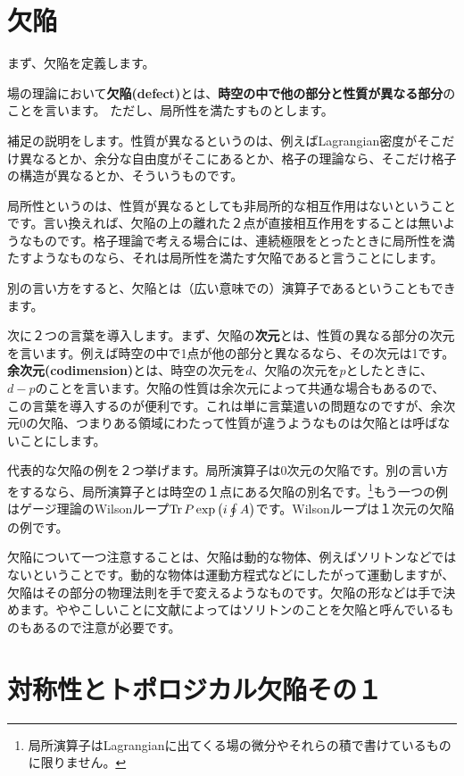 \documentclass[report,paper=a4, fontsize=12pt, line_length=16cm, number_of_lines=33,dvipdfmx]{jlreq}
\newcommand{\kyou}[1]{{\sffamily \bfseries #1}}
\numberwithin{equation}{chapter}
\begin{document}
\section{欠陥}

まず、欠陥を定義します。
\begin{emphasize}
  場の理論において\kyou{欠陥(defect)}とは、\kyou{時空の中で他の部分と性質が異なる部分}のことを言います。 ただし、局所性を満たすものとします。 
\end{emphasize}

補足の説明をします。性質が異なるというのは、例えばLagrangian密度がそこだけ異なるとか、余分な自由度がそこにあるとか、格子の理論なら、そこだけ格子の構造が異なるとか、そういうものです。

局所性というのは、性質が異なるとしても非局所的な相互作用はないということです。言い換えれば、欠陥の上の離れた２点が直接相互作用をすることは無いようなものです。格子理論で考える場合には、連続極限をとったときに局所性を満たすようなものなら、それは局所性を満たす欠陥であると言うことにします。

別の言い方をすると、欠陥とは（広い意味での）演算子であるということもできます。

次に２つの言葉を導入します。まず、欠陥の\kyou{次元}とは、性質の異なる部分の次元を言います。例えば時空の中で1点が他の部分と異なるなら、その次元は1です。\kyou{余次元(codimension)}とは、時空の次元を$d$、欠陥の次元を$p$としたときに、$d-p$のことを言います。欠陥の性質は余次元によって共通な場合もあるので、この言葉を導入するのが便利です。これは単に言葉遣いの問題なのですが、余次元0の欠陥、つまりある領域にわたって性質が違うようなものは欠陥とは呼ばないことにします。

代表的な欠陥の例を２つ挙げます。局所演算子は0次元の欠陥です。別の言い方をするなら、局所演算子とは時空の１点にある欠陥の別名です。\footnote{局所演算子はLagrangianに出てくる場の微分やそれらの積で書けているものに限りません。}もう一つの例はゲージ理論のWilsonループ$\Tr P \exp\left(i\oint A\right)$です。Wilsonループは１次元の欠陥の例です。

欠陥について一つ注意することは、欠陥は動的な物体、例えばソリトンなどではないということです。動的な物体は運動方程式などにしたがって運動しますが、欠陥はその部分の物理法則を手で変えるようなものです。欠陥の形などは手で決めます。ややこしいことに文献によってはソリトンのことを欠陥と呼んでいるものもあるので注意が必要です。

\section{対称性とトポロジカル欠陥その１}
\end{document}
